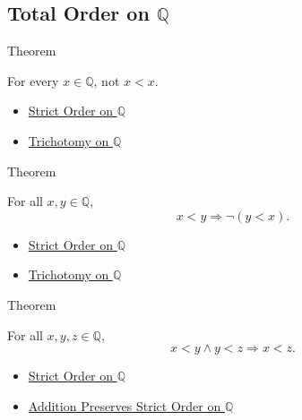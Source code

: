 \subsection*{\texorpdfstring{Total Order on $\mathbb{Q}$}{Total Order on Q}}

\begin{theorembox}{Theorem}
\begin{theorem}
\label{thm:strict-order-on-q-irreflexive}
For every $x\in\mathbb{Q}$, not $x<x$.
\end{theorem}
\end{theorembox}

\begin{dependencies}
\begin{itemize}
  \item \hyperref[def:strict-order-on-q]{Strict Order on $\mathbb{Q}$}
  \item \hyperref[thm:trichotomy-on-q]{Trichotomy on $\mathbb{Q}$}
\end{itemize}
\end{dependencies}

\begin{theorembox}{Theorem}
\begin{theorem}
\label{thm:strict-order-on-q-asymmetric}
For all $x,y\in\mathbb{Q}$,
\[
x<y \Longrightarrow \neg(y<x).
\]
\end{theorem}
\end{theorembox}

\begin{dependencies}
\begin{itemize}
  \item \hyperref[def:strict-order-on-q]{Strict Order on $\mathbb{Q}$}
  \item \hyperref[thm:trichotomy-on-q]{Trichotomy on $\mathbb{Q}$}
\end{itemize}
\end{dependencies}

\begin{theorembox}{Theorem}
\begin{theorem}
\label{thm:strict-order-on-q-transitive}
For all $x,y,z\in\mathbb{Q}$,
\[
x<y\land y<z \Longrightarrow x<z.
\]
\end{theorem}
\end{theorembox}

\begin{dependencies}
\begin{itemize}
  \item \hyperref[def:strict-order-on-q]{Strict Order on $\mathbb{Q}$}
  \item \hyperref[thm:addition-preserves-strict-order-on-q]{Addition Preserves Strict Order on $\mathbb{Q}$}
\end{itemize}
\end{dependencies}


